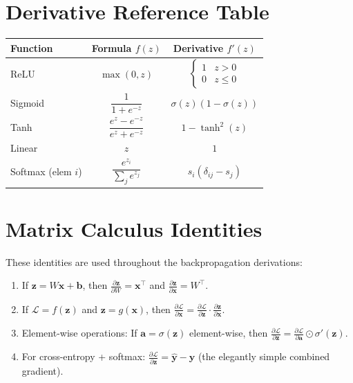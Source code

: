 \documentclass[12pt, a4paper]{report}
\theoremstyle{definition}
\begin{document}
\appendix
\chapter{Derivative Reference Table}

\begin{center}
\renewcommand{\arraystretch}{2.0}
\begin{tabular}{lcc}
\toprule
\textbf{Function} & \textbf{Formula} $f(z)$ & \textbf{Derivative} $f'(z)$ \\
\midrule
ReLU & $\max(0, z)$ & $\begin{cases} 1 & z > 0 \\ 0 & z \leq 0 \end{cases}$ \\[8pt]
Sigmoid & $\dfrac{1}{1+e^{-z}}$ & $\sigma(z)(1-\sigma(z))$ \\[8pt]
Tanh & $\dfrac{e^z - e^{-z}}{e^z + e^{-z}}$ & $1 - \tanh^2(z)$ \\[8pt]
Linear & $z$ & $1$ \\[8pt]
Softmax (elem $i$) & $\dfrac{e^{z_i}}{\sum_j e^{z_j}}$ & $s_i(\delta_{ij} - s_j)$ \\
\bottomrule
\end{tabular}
\end{center}

\chapter{Matrix Calculus Identities}

These identities are used throughout the backpropagation derivations:

\begin{enumerate}
    \item If $\mathbf{z} = W\mathbf{x} + \mathbf{b}$, then $\frac{\partial \mathbf{z}}{\partial W} = \mathbf{x}^\top$ and $\frac{\partial \mathbf{z}}{\partial \mathbf{x}} = W^\top$.
    
    \item If $\mathcal{L} = f(\mathbf{z})$ and $\mathbf{z} = g(\mathbf{x})$, then $\frac{\partial \mathcal{L}}{\partial \mathbf{x}} = \frac{\partial \mathcal{L}}{\partial \mathbf{z}} \cdot \frac{\partial \mathbf{z}}{\partial \mathbf{x}}$.
    
    \item Element-wise operations: If $\mathbf{a} = \sigma(\mathbf{z})$ element-wise, then $\frac{\partial \mathcal{L}}{\partial \mathbf{z}} = \frac{\partial \mathcal{L}}{\partial \mathbf{a}} \odot \sigma'(\mathbf{z})$.
    
    \item For cross-entropy + softmax: $\frac{\partial \mathcal{L}}{\partial \mathbf{z}} = \hat{\mathbf{y}} - \mathbf{y}$ (the elegantly simple combined gradient).
\end{enumerate}
\end{document}
